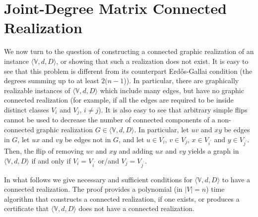 \documentclass[12pt,a4paper]{article}
\theoremstyle{definition}
\theoremstyle{plain}
\begin{document}
\section{Joint-Degree Matrix Connected Realization}
\label{sec:algorithm2}



We now turn to the question of constructing a connected graphic
realization of an instance $\langle{\mathbb V},d,D\rangle$,
or showing that such a realization does not exist.
It is easy to see that this problem
is different from its counterpart
Erd\H{o}s-Gallai condition (the degrees summing up
to at least $2(n\! - \! 1$)).
In particular, there are graphically realizable instances
of $\langle{\mathbb V},d,D\rangle$ which include many edges,
but have no graphic connected realization
(for example, if all the edges are required to be inside distinct 
classes $V_i$ and $V_j$, $i \! \neq \! j$).
It is also easy to see that arbitrary simple flips
cannot be used to decrease the number of connected components
of a non-connected graphic realization $G \in \langle{\mathbb V},d,D\rangle$.
In particular, let $uv$ and $xy$ be edges in $G$,
let $ux$ and $vy$ be edges not in $G$,
and let $u\in V_i$, $v\in V_j$, $x \in V_{i^{\prime}}$
and $y \in V_{j^{\prime}}$.
Then, the flip of removing $uv$ and $xy$
and adding $ux$ and $vy$ yields
a graph in  $\langle{\mathbb V},d,D\rangle$
if and only if $V_i \! = \! V_{i^{\prime}} $
or/and  $V_j \! = \! V_{j^{\prime}} $.

In what follows we 
give  necessary and sufficient conditions
for $\langle{\mathbb V},d,D\rangle$ to have a connected realization.
The proof provides a polynomial (in $|V|=n$) time algorithm that constructs a
connected realization, if one exists,
or produces a certificate that $\langle{\mathbb V},d,D\rangle$ does not have
a connected realization.
\end{document}
